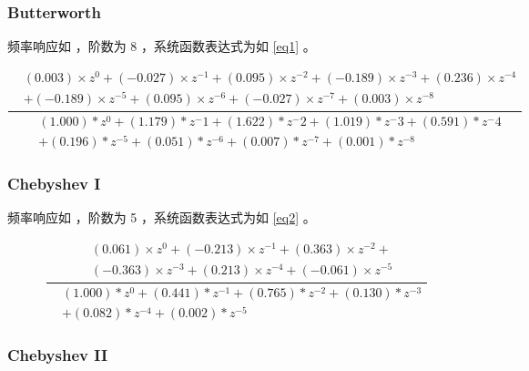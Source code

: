\documentclass[lang=cn,11pt,a4paper,cite=authoryear]{elegantpaper}
\begin{document}
\subsubsection{Butterworth}

频率响应如  ，阶数为 8 ，系统函数表达式为如 \eqref{eq1} 。

\begin{equation}\label{eq1}
    \dfrac{\begin{aligned}
        & (0.003) \times z^{0} + (-0.027) \times z^{-1} + (0.095) \times z^{-2} + (-0.189) \times z^{-3} + (0.236) \times z^{-4} \\
        & + (-0.189) \times z^{-5} + (0.095) \times z^{-6} + (-0.027) \times z^{-7} + (0.003) \times z^{-8}
    \end{aligned}}{\begin{aligned}
        &(1.000) * z^0 + (1.179) * z^-1 + (1.622) * z^-2 + (1.019) * z^-3 + (0.591) * z^-4 \\
        & + (0.196) * z^{-5} + (0.051) * z^{-6} + (0.007) * z^{-7} + (0.001) * z^{-8} 
    \end{aligned}}
\end{equation}




\subsubsection{Chebyshev I}

频率响应如  ，阶数为 5 ，系统函数表达式为如 \eqref{eq2} 。

\begin{equation}\label{eq2}
    \dfrac{\begin{aligned}
        &(0.061) \times z^{0} + (-0.213) \times z^{-1} + (0.363) \times z^{-2} + \\
        &(-0.363) \times z^{-3} + (0.213) \times z^{-4} + (-0.061) \times z^{-5} 
    \end{aligned}}{\begin{aligned}
        &(1.000) * z^{0} + (0.441) * z^{-1} + (0.765) * z^{-2} + (0.130) * z^{-3} \\
        &+ (0.082) * z^{-4} + (0.002) * z^{-5} 
    \end{aligned}}
\end{equation}



\subsubsection{Chebyshev II}
\end{document}
